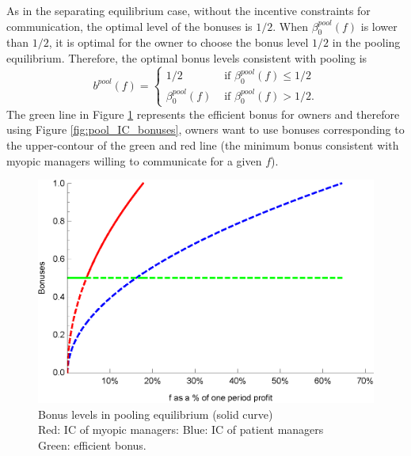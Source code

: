 \documentclass[]{article}
\newcommand{\sa}{s^0(\alpha,p^*)}
\begin{document}
As in the separating equilibrium case, without the incentive constraints for communication, the optimal level of the bonuses is $1/2$. When $\beta^{pool}_0(f)$ is lower than $1/2$, it is optimal for the owner to choose the bonus level $1/2$ in the pooling equilibrium. Therefore, the optimal bonus levels consistent with pooling is
\begin{equation}\label{bonuses-pooling}
b^{pool}(f) = 
\begin{cases}
1/2 & \text{ if }\beta^{pool}_0(f) \leq  1/2 \\
\beta^{pool}_0(f) & \text{ if }\beta^{pool}_0(f)>1/2.
\end{cases}
\end{equation}
The green line in Figure \ref{fig:optimal_bonuses_pooling} represents the efficient bonus for owners and therefore using Figure \ref{fig:pool_IC_bonuses}, owners want to use bonuses corresponding to the upper-contour of the green and red line (the minimum bonus consistent with myopic managers willing to communicate for a given $f$).
%
\begin{figure}[h!]
\centering
\includegraphics[scale=0.8]{Plots/Bertrand_bonuses_diff_bonus_pool2.eps}
\caption{Bonus levels in pooling equilibrium (solid curve)\\
Red: IC of myopic managers: Blue: IC of patient managers\\
Green: efficient bonus.}\label{fig:optimal_bonuses_pooling}
\end{figure}
\end{document}
